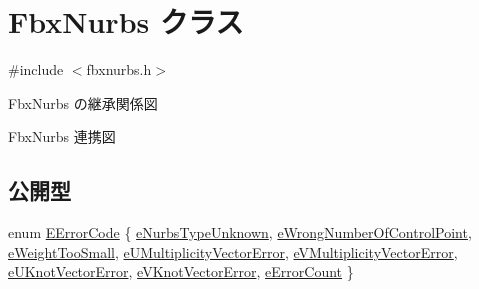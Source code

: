 \hypertarget{class_fbx_nurbs}{}\section{Fbx\+Nurbs クラス}
\label{class_fbx_nurbs}


{\ttfamily \#include $<$fbxnurbs.\+h$>$}



Fbx\+Nurbs の継承関係図


Fbx\+Nurbs 連携図
\subsection*{公開型}
\begin{DoxyCompactItemize}
\item 
enum \hyperlink{class_fbx_nurbs_a1ff85864ee6533b4b6d43537ec625a66}{E\+Error\+Code} \{ \newline
\hyperlink{class_fbx_nurbs_a1ff85864ee6533b4b6d43537ec625a66a01fe54ebb22d68039b935dc12cb21b83}{e\+Nurbs\+Type\+Unknown}, 
\hyperlink{class_fbx_nurbs_a1ff85864ee6533b4b6d43537ec625a66aaaae33f0afccdfa95a07c122a38ebf33}{e\+Wrong\+Number\+Of\+Control\+Point}, 
\hyperlink{class_fbx_nurbs_a1ff85864ee6533b4b6d43537ec625a66a4b31ff7d5ef981f92c5feff4a22f486b}{e\+Weight\+Too\+Small}, 
\hyperlink{class_fbx_nurbs_a1ff85864ee6533b4b6d43537ec625a66a0181fd0c91ed8468c636035f64bd061d}{e\+U\+Multiplicity\+Vector\+Error}, 
\newline
\hyperlink{class_fbx_nurbs_a1ff85864ee6533b4b6d43537ec625a66a0798e68b10240a4d23aaafbf36b5d613}{e\+V\+Multiplicity\+Vector\+Error}, 
\hyperlink{class_fbx_nurbs_a1ff85864ee6533b4b6d43537ec625a66a2d3f400bc97c95a4168ece3f64910bbf}{e\+U\+Knot\+Vector\+Error}, 
\hyperlink{class_fbx_nurbs_a1ff85864ee6533b4b6d43537ec625a66a6c64868e85a2725eedd4e3fa4e0c0263}{e\+V\+Knot\+Vector\+Error}, 
\hyperlink{class_fbx_nurbs_a1ff85864ee6533b4b6d43537ec625a66a64ca63e4e6ce550332041256bc6f7227}{e\+Error\+Count}
 \}
\end{DoxyCompactItemize}

